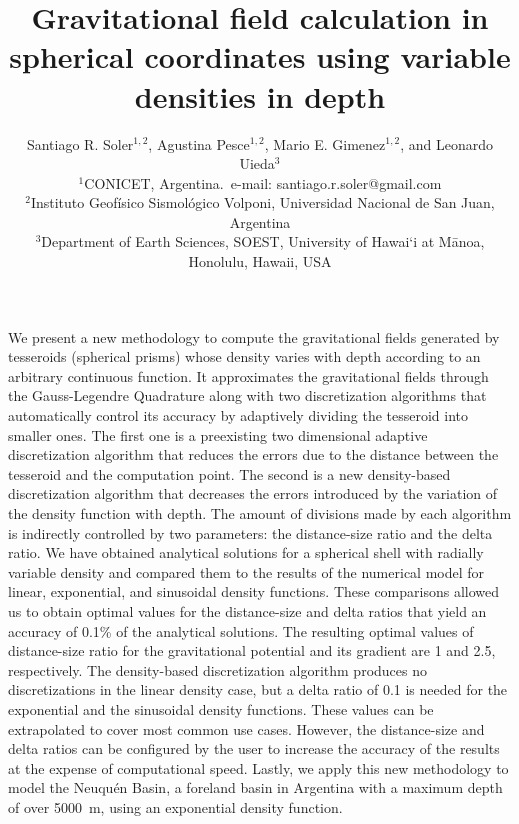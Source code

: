 \documentclass[extra, referee]{gji}
\begin{document}
\title[Variable Density Tesseroids]{
    Gravitational field calculation in spherical coordinates using variable
    densities in depth
}
\author[S.R. Soler, A. Pesce, M.E. Gimenez, and L. Uieda]{
    Santiago R. Soler$^{1,2}$, Agustina Pesce$^{1,2}$,
    Mario E. Gimenez$^{1,2}$, and Leonardo Uieda$^3$ \\
    $^1$CONICET, Argentina.~e-mail: santiago.r.soler@gmail.com\\
    $^2$Instituto Geofísico Sismológico Volponi, Universidad Nacional de
    San Juan, Argentina\\
    $^3$Department of Earth Sciences, SOEST, University of Hawai‘i at
    M\={a}noa, Honolulu, Hawaii, USA
}


\maketitle

\begin{summary}
We present a new methodology to compute the gravitational fields generated by
tesseroids (spherical prisms) whose density varies with depth according to
an arbitrary continuous function.
It approximates the gravitational fields through the Gauss-Legendre Quadrature along
with two discretization algorithms that automatically control its accuracy by adaptively
dividing the tesseroid into smaller ones.
The first one is a preexisting two dimensional adaptive discretization algorithm that
reduces the errors due to the distance between the tesseroid and the computation point.
The second is a new density-based discretization algorithm that
decreases the errors introduced by the variation of the density function with depth.
The amount of divisions made by each algorithm is indirectly controlled
by two parameters: the distance-size ratio and the delta ratio.
We have obtained analytical solutions for a spherical shell with radially variable
density and compared them to the results of the numerical model for linear,
exponential, and sinusoidal density functions.
These comparisons allowed us to obtain optimal values for the distance-size and
delta ratios that yield an accuracy of 0.1\% of the analytical solutions.
The resulting optimal values of distance-size ratio for the gravitational potential and
its gradient are 1 and 2.5, respectively.
The density-based discretization algorithm produces no discretizations in the linear
density case, but a delta ratio of 0.1 is needed for the exponential and the
sinusoidal density functions.
These values can be extrapolated to cover most common use cases.
However, the distance-size and delta ratios can be configured by the user to increase
the accuracy of the results at the expense of computational speed.
Lastly, we apply this new methodology to model the Neuqu\'en Basin, a foreland basin in
Argentina with a maximum depth of over 5000~m, using an exponential density function.
\end{summary}
\end{document}
